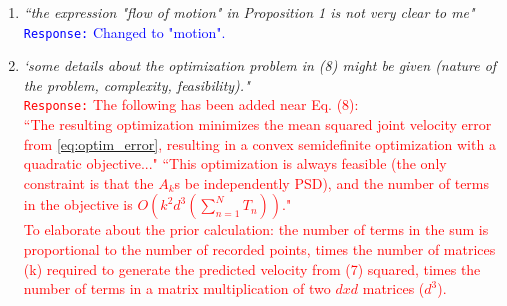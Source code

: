 \documentclass[10pt,stdletter,dateno]{newlfm}
\begin{document}
\begin{newlfm}
\begin{enumerate}
\item \textit{``the expression "flow of motion" in Proposition 1 is not very clear to me"}\\
\textcolor{blue}{\texttt{Response:} \small Changed to "motion".}\\

\item \textit{`some details about the optimization problem in (8) might be given
(nature of the problem, complexity, feasibility)."}\\
\textcolor{red}{\texttt{Response:} \small The following has been added near Eq. (8):\\
``The resulting optimization minimizes the mean squared joint velocity error from \eqref{eq:optim_error}, resulting in a convex semidefinite optimization with a quadratic objective..."
``This optimization is always feasible (the only constraint is that the $A_k$s be independently PSD), and the number of terms in the objective is $O\left(k^2d^3\left( \sum_{n=1}^N T_n\right)\right)$."\\
To elaborate about the prior calculation: the number of terms in the sum is proportional to the number of recorded points, times the number of matrices (k) required to generate the predicted velocity from (7) squared, times the number of terms in a matrix multiplication of two $d x d$ matrices ($d^3$).}\\



\end{enumerate}


\end{newlfm}
\end{document}
